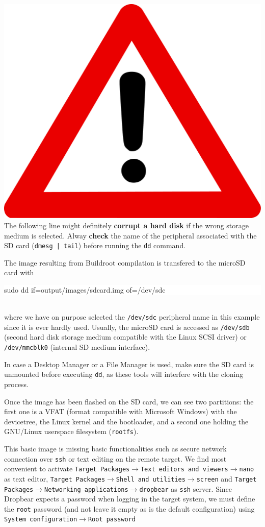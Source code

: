 \documentclass[a4paper]{article}
\begin{document}
\includegraphics[width=.7cm]{danger} 
The following line might definitely {\bf corrupt a hard disk} if the wrong storage
medium is selected. Alway {\bf check} the name of the peripheral associated with
the SD card (\verb~dmesg | tail~) before running the {\tt dd} command.

The image resulting from Buildroot compilation is transfered to the microSD card with\\
\colorbox{white}{\begin{minipage}{0.9\textwidth}
sudo dd if=output/images/sdcard.img of=/dev/sdc
\end{minipage}} \\
where we have on purpose selected the {\tt /dev/sdc} peripheral name in this example
since it is ever hardly used. Usually, the microSD card is accessed as {\tt /dev/sdb} 
(second hard disk storage medium compatible with the Linux SCSI driver)
or {\tt /dev/mmcblk0} (internal SD medium interface).

In case a Desktop Manager or a File Manager is used, make sure the SD card is unmounted
before executing {\tt dd}, as these tools will interfere with the cloning process.

\noindent{}

Once the image has been flashed on the SD card, we can see two partitions: the first one
is a VFAT (format compatible with Microsoft Windows) with the devicetree, the Linux 
kernel and the bootloader, and a second one holding the GNU/Linux userspace filesystem
({\tt rootfs}).

This basic image is missing basic functionalities such as secure network connection over 
{\tt ssh} or text editing on the remote target. We find most convenient to activate
{\tt Target Packages}$\rightarrow${\tt Text editors and viewers}$\rightarrow${\tt nano} as
text editor, {\tt Target Packages}$\rightarrow${\tt Shell and utilities}$\rightarrow${\tt screen}
and {\tt Target Packages}$\rightarrow${\tt Networking applications}$\rightarrow${\tt dropbear}
as {\tt ssh} server. Since Dropbear expects a password when logging in the target system,
we must define the {\tt root} password (and not leave it empty as is the default configuration)
using {\tt System configuration}$\rightarrow${\tt Root password}
\end{document}
